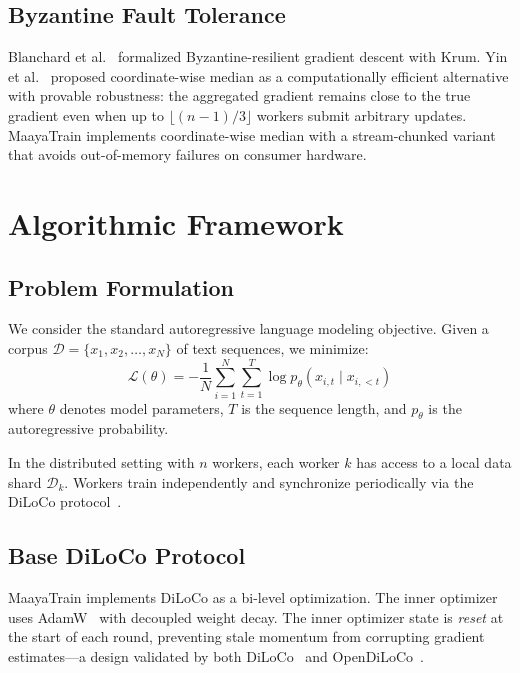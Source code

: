 \documentclass[10pt,conference]{IEEEtran}
\begin{document}
\subsection{Byzantine Fault Tolerance}

Blanchard et al.~\cite{blanchard2017byzantine} formalized Byzantine-resilient
gradient descent with Krum. Yin et al.~\cite{yin2018byzantine} proposed
coordinate-wise median as a computationally efficient alternative with
provable robustness: the aggregated gradient remains close to the true
gradient even when up to $\lfloor(n{-}1)/3\rfloor$ workers submit arbitrary
updates. MaayaTrain implements coordinate-wise median with a stream-chunked
variant that avoids out-of-memory failures on consumer hardware.


\section{Algorithmic Framework}
\label{sec:framework}

\subsection{Problem Formulation}

We consider the standard autoregressive language modeling objective. Given a
corpus $\mathcal{D} = \{x_1, x_2, \ldots, x_N\}$ of text sequences, we
minimize:
\begin{equation}
  \mathcal{L}(\theta) = -\frac{1}{N}\sum_{i=1}^{N}\sum_{t=1}^{T}
  \log p_\theta(x_{i,t} \mid x_{i,<t})
  \label{eq:lm-loss}
\end{equation}
where $\theta$ denotes model parameters, $T$ is the sequence length, and
$p_\theta$ is the autoregressive probability.

In the distributed setting with $n$ workers, each worker $k$ has access to a
local data shard $\mathcal{D}_k$. Workers train independently and synchronize
periodically via the DiLoCo protocol~\cite{douillard2023diloco}.

\subsection{Base DiLoCo Protocol}

MaayaTrain implements DiLoCo as a bi-level optimization. The inner optimizer
uses AdamW~\cite{loshchilov2019adamw} with decoupled weight decay. The inner
optimizer state is \emph{reset} at the start of each round, preventing stale
momentum from corrupting gradient estimates---a design validated by both
DiLoCo~\cite{douillard2023diloco} and OpenDiLoCo~\cite{jaghouar2024opendiloco}.
\end{document}
